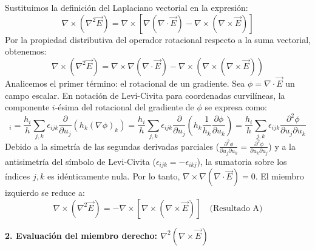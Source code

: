 \documentclass[a4paper]{article}
\begin{document}
Sustituimos la definición del Laplaciano vectorial en la expresión:
\begin{equation}
\nabla \times (\nabla^2 \vec{E}) = \nabla \times \left[ \nabla(\nabla \cdot \vec{E}) - \nabla \times (\nabla \times \vec{E}) \right]
\end{equation}
Por la propiedad distributiva del operador rotacional respecto a la suma vectorial, obtenemos:
\begin{equation}
\nabla \times (\nabla^2 \vec{E}) = \nabla \times \nabla(\nabla \cdot \vec{E}) - \nabla \times (\nabla \times (\nabla \times \vec{E}))
\end{equation}
Analicemos el primer término: el rotacional de un gradiente. Sea $\phi = \nabla \cdot \vec{E}$ un campo escalar. En notación de Levi-Civita para coordenadas curvilíneas, la componente $i$-ésima del rotacional del gradiente de $\phi$ se expresa como:
\begin{equation}
[\nabla \times \nabla \phi]_i = \frac{h_i}{h} \sum_{j,k} \epsilon_{ijk} \frac{\partial}{\partial u_j} \left( h_k (\nabla \phi)_k \right) = \frac{h_i}{h} \sum_{j,k} \epsilon_{ijk} \frac{\partial}{\partial u_j} \left( h_k \frac{1}{h_k} \frac{\partial \phi}{\partial u_k} \right) = \frac{h_i}{h} \sum_{j,k} \epsilon_{ijk} \frac{\partial^2 \phi}{\partial u_j \partial u_k}
\end{equation}
Debido a la simetría de las segundas derivadas parciales ($\frac{\partial^2 \phi}{\partial u_j \partial u_k} = \frac{\partial^2 \phi}{\partial u_k \partial u_j}$) y a la antisimetría del símbolo de Levi-Civita ($\epsilon_{ijk} = -\epsilon_{ikj}$), la sumatoria sobre los índices $j, k$ es idénticamente nula. Por lo tanto, $\nabla \times \nabla(\nabla \cdot \vec{E}) = 0$. El miembro izquierdo se reduce a:
\begin{equation}
\nabla \times (\nabla^2 \vec{E}) = - \nabla \times \left[ \nabla \times (\nabla \times \vec{E}) \right] \quad \text{(Resultado A)}
\end{equation}

\textbf{2. Evaluación del miembro derecho: $\nabla^2 (\nabla \times \vec{E})$}
\end{document}

